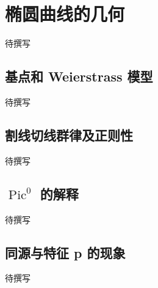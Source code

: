 
% 
% 

\section{椭圆曲线的几何}
\label{g5:sec:2403}

待撰写

\subsection{基点和 Weierstrass 模型}
\label{g5:subsec:2403:01}
待撰写

\subsection{割线切线群律及正则性}
\label{g5:subsec:2403:02}
待撰写

\subsection{\texorpdfstring{\(\operatorname{Pic}^0\) 的解释}{Pic⁰ 的解释}}
\label{g5:subsec:2403:03}
待撰写

\subsection{同源与特征 p 的现象}
\label{g5:subsec:2403:04}
待撰写
